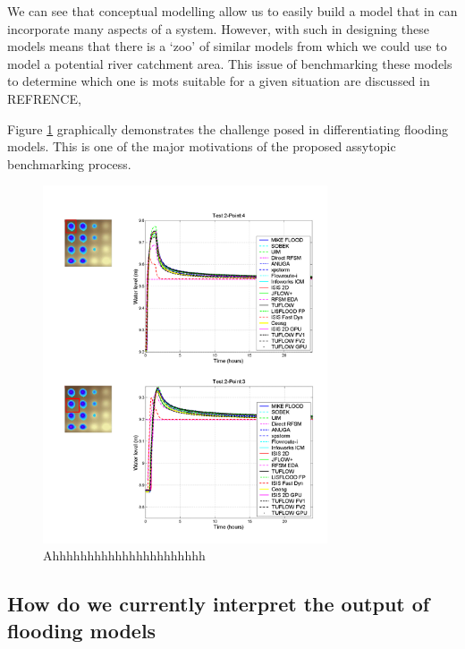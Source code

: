 \documentclass[11pt]{article}
\begin{document}
\vspace{1cm}
\begin{minipage}{0.3\textwidth}
    We can see that conceptual modelling allow us to easily build a model that in can incorporate many aspects of a system. However, with such in designing these models means that there is a `zoo' of similar models from which we could use to model a potential river catchment area. This issue of benchmarking these models to determine which one is mots suitable for a given situation are discussed in REFRENCE, 

    Figure \ref{fig:eaBench}  graphically demonstrates the challenge posed in differentiating flooding models. This is one of the major motivations of the proposed assytopic benchmarking process.
\end{minipage}
\begin{minipage}{0.6\textwidth}
    \begin{figure}[H]
        \centering
        \includegraphics[width=0.75\textwidth]{Figs/EA_bench.png}
        \caption{Ahhhhhhhhhhhhhhhhhhhhhh}
        \label{fig:eaBench}
    \end{figure}
\end{minipage}







\subsection{How do we currently interpret the output of flooding models}
\end{document}
